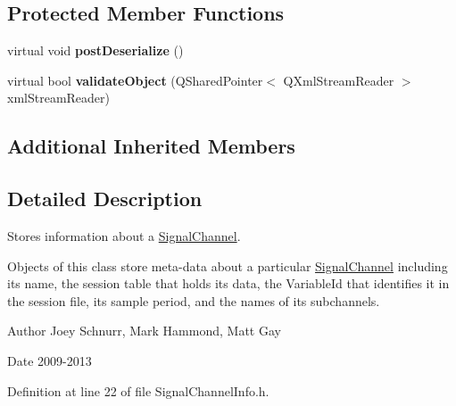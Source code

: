 \subsection*{Protected Member Functions}
\begin{DoxyCompactItemize}
\item 
\hypertarget{class_picto_1_1_signal_channel_info_af51eab96b6cf4c1ab42daff1b9569497}{virtual void {\bfseries post\-Deserialize} ()}\label{class_picto_1_1_signal_channel_info_af51eab96b6cf4c1ab42daff1b9569497}

\item 
\hypertarget{class_picto_1_1_signal_channel_info_a3641f6caa0ac7f52b4086fb7011b0d27}{virtual bool {\bfseries validate\-Object} (Q\-Shared\-Pointer$<$ Q\-Xml\-Stream\-Reader $>$ xml\-Stream\-Reader)}\label{class_picto_1_1_signal_channel_info_a3641f6caa0ac7f52b4086fb7011b0d27}

\end{DoxyCompactItemize}
\subsection*{Additional Inherited Members}


\subsection{Detailed Description}
Stores information about a \hyperlink{class_picto_1_1_signal_channel}{Signal\-Channel}. 

Objects of this class store meta-\/data about a particular \hyperlink{class_picto_1_1_signal_channel}{Signal\-Channel} including its name, the session table that holds its data, the Variable\-Id that identifies it in the session file, its sample period, and the names of its subchannels. \begin{DoxyAuthor}{Author}
Joey Schnurr, Mark Hammond, Matt Gay 
\end{DoxyAuthor}
\begin{DoxyDate}{Date}
2009-\/2013 
\end{DoxyDate}


Definition at line 22 of file Signal\-Channel\-Info.\-h.



